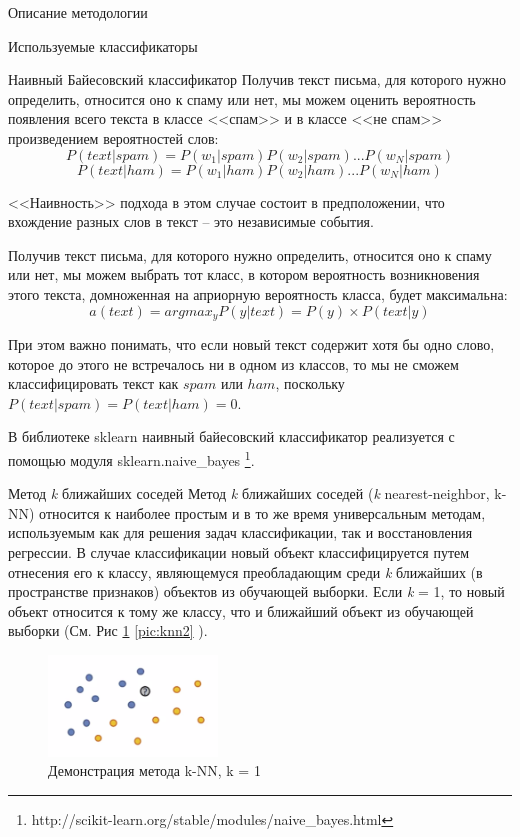 \begin{section}{Описание методологии}
\begin{subsection}{Используемые классификаторы}
\begin{subsubsection}{Наивный Байесовский классификатор}
Получив текст письма, для которого нужно определить, относится оно к спаму или нет, мы можем оценить вероятность появления всего текста в классе <<спам>> и в классе <<не спам>> произведением вероятностей слов:
\begin{equation}
P(text|spam) = P(w_1|spam)P(w_2|spam)...P(w_N|spam)
\end{equation}
\begin{equation}
P(text|ham) = P(w_1|ham)P(w_2|ham)...P(w_N|ham)
\end{equation}

<<Наивность>> подхода в этом случае состоит в предположении, что вхождение разных слов в текст – это независимые события.

Получив текст письма, для которого нужно определить, относится оно к спаму или нет, мы можем выбрать тот класс, в котором вероятность возникновения этого текста, домноженная на априорную вероятность класса, будет максимальна:
\begin{equation}
a(text) = arg⁡max_{y}⁡ P(y|text) = P(y) \times P(text|y)
\end{equation}

При этом важно понимать, что если новый текст содержит хотя бы одно слово, которое до этого не встречалось ни в одном из классов, то мы не сможем классифицировать текст как $spam$ или $ham$, поскольку $P(text|spam) = P(text|ham) = 0$.


В библиотеке sklearn наивный байесовский классификатор реализуется с помощью модуля sklearn.naive\_bayes \footnote{http://scikit-learn.org/stable/modules/naive\_bayes.html}.


\end{subsubsection}

    \begin{subsubsection}{Метод \textit{k} ближайших соседей}
      \label{alg:knn}
      Метод \textit{k} ближайших соседей (\textit{k} nearest-neighbor, k-NN) относится к наиболее простым и в то же время универсальным методам, используемым как для решения задач классификации, так и восстановления регрессии. В случае классификации новый объект классифицируется путем отнесения его к классу, являющемуся преобладающим среди \textit{k} ближайших (в пространстве признаков) объектов из обучающей выборки. Если \textit{k} = 1, то новый объект относится к тому же классу, что и ближайший объект из обучающей выборки (См. Рис \ref{pic:knn1} \ref{pic:knn2} ).

\begin{figure}[ht!]
\centering
\includegraphics[width=0.4\textwidth]{pics/knn1}
\caption{Демонстрация метода k-NN, k = 1}
\label{pic:knn1}
\end{figure}



\end{subsubsection}
\end{subsection}
\end{section}
